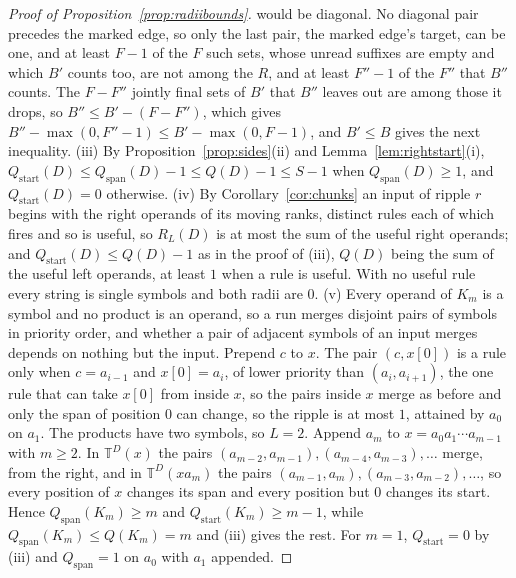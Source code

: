 \documentclass[11pt,a4paper]{article}
\theoremstyle{definition}
\theoremstyle{plain}
\newcommand{\T}{\mathbb{T}}
\newcommand{\ripple}{R_{L}}
\begin{document}
\begin{proof}[Proof of Proposition~\ref{prop:radiibounds}]
would be diagonal. No diagonal pair precedes the marked edge, so only the last pair, the marked edge's target, can be
one, and at least \(F - 1\) of the \(F\) such sets, whose unread suffixes are empty and which \(B'\) counts too, are not
among the \(R\), and at least \(F'' - 1\) of the \(F''\) that \(B''\) counts. The \(F - F''\) jointly final sets of
\(B'\) that \(B''\) leaves out are among those it drops, so \(B'' \le B' - (F - F'')\), which gives
\(B'' - \max(0, F'' - 1) \le B' - \max(0, F - 1)\), and \(B' \le B\) gives the next inequality. (iii) By
Proposition~\ref{prop:sides}(ii) and Lemma~\ref{lem:rightstart}(i),
\(Q_{\mathrm{start}}(D) \le Q_{\mathrm{span}}(D) - 1 \le Q(D) - 1 \le S - 1\) when \(Q_{\mathrm{span}}(D) \ge 1\), and
\(Q_{\mathrm{start}}(D) = 0\) otherwise. (iv) By Corollary~\ref{cor:chunks} an input of ripple \(r\) begins with the
right operands of its moving ranks, distinct rules each of which fires and so is useful, so \(\ripple(D)\) is at most
the sum of the useful right operands; and \(Q_{\mathrm{start}}(D) \le Q(D) - 1\) as in the proof of (iii), \(Q(D)\)
being the sum of the useful left operands, at least \(1\) when a rule is useful. With no useful rule every string is
single symbols and both radii are \(0\). (v) Every operand of \(K_m\) is a symbol and no product is an operand, so a run
merges disjoint pairs of symbols in priority order, and whether a pair of adjacent symbols of an input merges depends on
nothing but the input. Prepend \(c\) to \(x\). The pair \((c, x[0])\) is a rule only when \(c = a_{i-1}\) and
\(x[0] = a_i\), of lower priority than \((a_i, a_{i+1})\), the one rule that can take \(x[0]\) from inside \(x\), so the
pairs inside \(x\) merge as before and only the span of position \(0\) can change, so the ripple is at most \(1\),
attained by \(a_0\) on \(a_1\). The products have two symbols, so \(L = 2\). Append \(a_m\) to
\(x = a_0 a_1 \cdots a_{m-1}\) with \(m \ge 2\). In \(\T^D(x)\) the pairs
\((a_{m-2}, a_{m-1}), (a_{m-4}, a_{m-3}), \dots\) merge, from the right, and in \(\T^D(x a_m)\) the pairs
\((a_{m-1}, a_m), (a_{m-3}, a_{m-2}), \dots\), so every position of \(x\) changes its span and every position but \(0\)
changes its start. Hence \(Q_{\mathrm{span}}(K_m) \ge m\) and \(Q_{\mathrm{start}}(K_m) \ge m - 1\), while
\(Q_{\mathrm{span}}(K_m) \le Q(K_m) = m\) and (iii) gives the rest. For \(m = 1\), \(Q_{\mathrm{start}} = 0\) by (iii)
and \(Q_{\mathrm{span}} = 1\) on \(a_0\) with \(a_1\) appended.
\end{proof}

\end{document}
